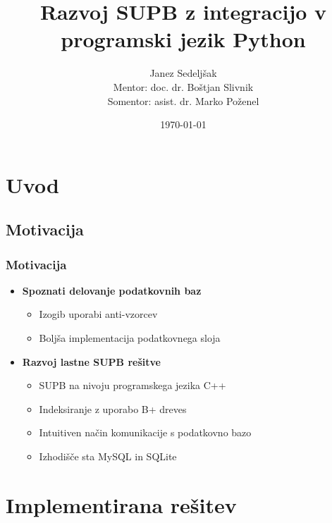 \documentclass{beamer}
\title{Razvoj SUPB z integracijo v programski jezik Python} %
\author{Janez Sedeljšak
\\ Mentor: doc. dr. Boštjan Slivnik
\\ Somentor: asist. dr. Marko Poženel
} %
\institute[UL FRI] %
{
Univerza v Ljubljani, Fakulteta za računalništvo in informatiko \\ %
\medskip
\textit{js0578@student.uni-lj.si} %
}
\date{\today} %
\begin{document}
\begin{frame}
\titlepage %
\end{frame}


\section{Uvod} %

\subsection{Motivacija}
\begin{frame}
\frametitle{Motivacija}
    \begin{itemize}
        \item{\textbf{Spoznati delovanje podatkovnih baz}}
        \begin{itemize}
            \item{Izogib uporabi anti-vzorcev}
            \item{Boljša implementacija podatkovnega sloja}
        \end{itemize}
    \end{itemize}
    \vfill
    \begin{itemize}
        \item{\textbf{Razvoj lastne SUPB rešitve}}
        \begin{itemize}
            \item{SUPB na nivoju programskega jezika C++}
            \item{Indeksiranje z uporabo B+ dreves}
            \item{Intuitiven način komunikacije s podatkovno bazo}
            \item{Izhodišče sta MySQL in SQLite}
        \end{itemize}
    \end{itemize}
\end{frame}

\section{Implementirana rešitev}
\end{document}
